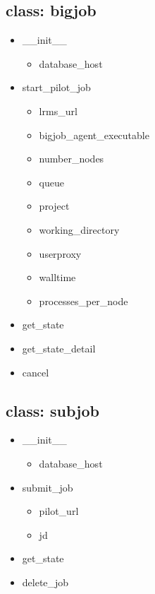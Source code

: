 \documentclass[]{article}
\begin{document}
\subsection{class: bigjob}


\begin{itemize}
	\item \_\_init\_\_
		\begin{itemize}
			\item database\_host
		\end{itemize}
	\item start\_pilot\_job
	\begin{itemize}
		\item lrms\_url
		\item bigjob\_agent\_executable
		\item number\_nodes
		\item queue
		\item project
		\item working\_directory
		\item userproxy
		\item walltime
		\item processes\_per\_node
	\end{itemize}
	\item get\_state	
	\item get\_state\_detail
	\item cancel
\end{itemize}

\subsection{class: subjob}
\begin{itemize}
\item \_\_init\_\_
		\begin{itemize}
			\item database\_host
		\end{itemize}
	\item submit\_job
	\begin{itemize}
		\item pilot\_url
		\item jd
	\end{itemize}

	\item get\_state

	\item delete\_job
\end{itemize}



\end{document}
